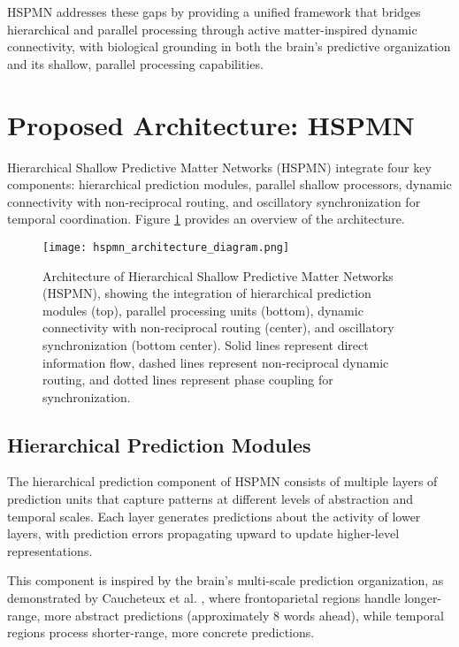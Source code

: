 \documentclass[11pt,a4paper,twocolumn]{article}
\begin{document}
HSPMN addresses these gaps by providing a unified framework that bridges hierarchical and parallel processing through active matter-inspired dynamic connectivity, with biological grounding in both the brain's predictive organization and its shallow, parallel processing capabilities.

\section{Proposed Architecture: HSPMN}

Hierarchical Shallow Predictive Matter Networks (HSPMN) integrate four key components: hierarchical prediction modules, parallel shallow processors, dynamic connectivity with non-reciprocal routing, and oscillatory synchronization for temporal coordination. Figure \ref{fig:hspmn-architecture} provides an overview of the architecture.

\begin{figure}[t]
    \centering
    \texttt{[image: hspmn\_architecture\_diagram.png]}
    \caption{Architecture of Hierarchical Shallow Predictive Matter Networks (HSPMN), showing the integration of hierarchical prediction modules (top), parallel processing units (bottom), dynamic connectivity with non-reciprocal routing (center), and oscillatory synchronization (bottom center). Solid lines represent direct information flow, dashed lines represent non-reciprocal dynamic routing, and dotted lines represent phase coupling for synchronization.}
    \label{fig:hspmn-architecture}
\end{figure}

\subsection{Hierarchical Prediction Modules}

The hierarchical prediction component of HSPMN consists of multiple layers of prediction units that capture patterns at different levels of abstraction and temporal scales. Each layer generates predictions about the activity of lower layers, with prediction errors propagating upward to update higher-level representations.

This component is inspired by the brain's multi-scale prediction organization, as demonstrated by Caucheteux et al. \cite{caucheteux2023evidence}, where frontoparietal regions handle longer-range, more abstract predictions (approximately 8 words ahead), while temporal regions process shorter-range, more concrete predictions.
\end{document}
